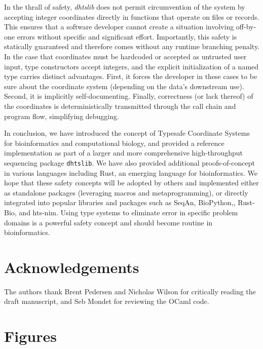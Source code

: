 \documentclass[12pt]{article}
\begin{document}
In the thrall of safety, \textit{dhtslib} does not permit circumvention of the system by accepting integer coordinates directly in functions that operate on files or records. This ensures that a software developer cannot create a situation involving off-by-one errors without specific and significant effort. Importantly, this safety is statically guaranteed and therefore comes without any runtime branching penalty. In the case that coordinates must be hardcoded or accepted as untrusted user input, type constructors accept integers, and the explicit initialization of a named type carries distinct advantages. First, it forces the developer in these cases to be sure about the coordinate system (depending on the data’s downstream use). Second, it is implicitly self-documenting. Finally, correctness (or lack thereof) of the coordinates is deterministically transmitted through the call chain and program flow, simplifying debugging.

In conclusion, we have introduced the concept of Typesafe Coordinate Systems for bioinformatics and computational biology, and provided a reference implementation as part of a larger and more comprehensive high-throughput sequencing package \texttt{dhtslib}. We have also provided additional proofs-of-concept in various languages including Rust, an emerging language for bioinformatics. We hope that these safety concepts will be adopted by others and implemented either as standalone packages (leveraging macros and metaprogramming), or directly integrated into popular libraries and packages such as SeqAn,\cite{reinert_seqan_2017} BioPython,\cite{cock_biopython_2009}, Rust-Bio,\cite{koster_rust-bio_2016} and hts-nim.\cite{pedersen_hts-nim_2018} Using type systems to eliminate error in specific problem domains is a powerful safety concept and should become routine in bioinformatics.



\section*{Acknowledgements} %

The authors thank Brent Pedersen and Nicholas Wilson for critically reading the draft manuscript, and Seb Mondet for reviewing the OCaml code.

\newpage
\printbibliography

\newpage
\section*{Figures}
\end{document}
